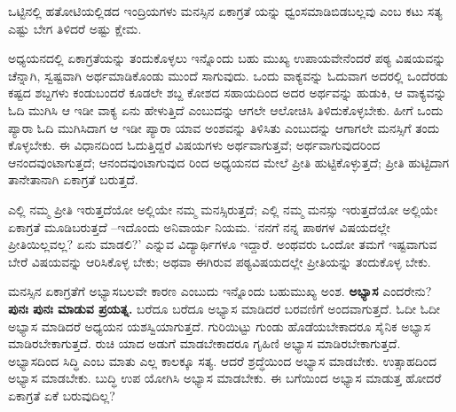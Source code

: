 ಒಟ್ಟಿನಲ್ಲಿ ಹತೋಟಿಯಲ್ಲಿಡದ ಇಂದ್ರಿಯಗಳು ಮನಸ್ಸಿನ ಏಕಾಗ್ರತೆ ಯನ್ನು ಧ್ವಂಸಮಾಡಿಬಿಡಬಲ್ಲವು ಎಂಬ ಕಟು ಸತ್ಯ ಎಷ್ಟು ಬೇಗ ತಿಳಿದರೆ ಅಷ್ಟು ಕ್ಷೇಮ.

ಅಧ್ಯಯನದಲ್ಲಿ ಏಕಾಗ್ರತೆಯನ್ನು ತಂದುಕೊಳ್ಳಲು ಇನ್ನೊಂದು ಬಹು ಮುಖ್ಯ ಉಪಾಯವೇನೆಂದರೆ ಪಠ್ಯ ವಿಷಯವನ್ನು ಚೆನ್ನಾಗಿ, ಸ್ವಷ್ಟವಾಗಿ ಅರ್ಥಮಾಡಿಕೊಂಡು ಮುಂದೆ ಸಾಗುವುದು. ಒಂದು ವಾಕ್ಯವನ್ನು ಓದುವಾಗ ಅದರಲ್ಲಿ ಒಂದೆರಡು ಕಷ್ಟದ ಶಬ್ದಗಳು ಕಂಡುಬಂದರೆ ಕೂಡಲೇ ಶಬ್ದ ಕೋಶದ ಸಹಾಯದಿಂದ ಅದರ ಅರ್ಥವನ್ನು ಹುಡುಕಿ, ಆ ವಾಕ್ಯವನ್ನು ಓದಿ ಮುಗಿಸಿ ಆ ಇಡೀ ವಾಕ್ಯ ಏನು ಹೇಳುತ್ತಿದೆ ಎಂಬುದನ್ನು ಆಗಲೇ ಆಲೋಚಿಸಿ ತಿಳಿದುಕೊಳ್ಳಬೇಕು. ಹೀಗೆ ಒಂದು ಪ್ಯಾರಾ ಓದಿ ಮುಗಿಸಿದಾಗ ಆ ಇಡೀ ಪ್ಯಾರಾ ಯಾವ ಅಂಶವನ್ನು ತಿಳಿಸಿತು ಎಂಬುದನ್ನು ಆಗಾಗಲೇ ಮನಸ್ಸಿಗೆ ತಂದು ಕೊಳ್ಳಬೇಕು. ಈ ವಿಧಾನದಿಂದ ಓದುತ್ತಿದ್ದರೆ ವಿಷಯಗಳು ಅರ್ಥವಾಗುತ್ತವೆ; ಅರ್ಥವಾಗುವುದರಿಂದ ಆನಂದವುಂಟಾಗುತ್ತದೆ; ಆನಂದವುಂಟಾಗುವುದ ರಿಂದ ಅಧ್ಯಯನದ ಮೇಲೆ ಪ್ರೀತಿ ಹುಟ್ಟಿಕೊಳ್ಳುತ್ತದೆ; ಪ್ರೀತಿ ಹುಟ್ಟಿದಾಗ ತಾನೇತಾನಾಗಿ ಏಕಾಗ್ರತೆ ಬರುತ್ತದೆ. 

ಎಲ್ಲಿ ನಮ್ಮ ಪ್ರೀತಿ ಇರುತ್ತದೆಯೋ ಅಲ್ಲಿಯೇ ನಮ್ಮ ಮನಸ್ಸಿರುತ್ತದೆ; ಎಲ್ಲಿ ನಮ್ಮ ಮನಸ್ಸು ಇರುತ್ತದೆಯೋ ಅಲ್ಲಿಯೇ ಏಕಾಗ್ರತೆ ಮೂಡಿಬರುತ್ತದೆ –ಇದೊಂದು ಅನಿವಾರ್ಯ ನಿಯಮ. ‘ನನಗೆ ನನ್ನ ಪಾಠಗಳ ವಿಷಯದಲ್ಲೇ ಪ್ರೀತಿಯಿಲ್ಲವಲ್ಲ? ಏನು ಮಾಡಲಿ?’ ಎನ್ನುವ ವಿದ್ಯಾರ್ಥಿಗಳೂ ಇದ್ದಾರೆ. ಅಂಥವರು ಒಂದೋ ತಮಗೆ ಇಷ್ಟವಾಗುವ ಬೇರೆ ವಿಷಯವನ್ನು ಆರಿಸಿಕೊಳ್ಳ ಬೇಕು; ಅಥವಾ ಈಗಿರುವ ಪಠ್ಯವಿಷಯದಲ್ಲೇ ಪ್ರೀತಿಯನ್ನು ತಂದುಕೊಳ್ಳ ಬೇಕು.

ಮನಸ್ಸಿನ ಏಕಾಗ್ರತೆಗೆ ಅಭ್ಯಾಸಬಲವೇ ಕಾರಣ ಎಂಬುದು ಇನ್ನೊಂದು ಬಹುಮುಖ್ಯ ಅಂಶ. \textbf{ಅಭ್ಯಾಸ} ಎಂದರೇನು? \textbf{ಪುನಃ ಪುನಃ ಮಾಡುವ ಪ್ರಯತ್ನ.} ಬರೆದೂ ಬರೆದೂ ಅಭ್ಯಾಸ ಮಾಡಿದರೆ ಬರವಣಿಗೆ ಅಂದವಾಗುತ್ತದೆ. ಓದೀ ಓದೀ ಅಭ್ಯಾಸ ಮಾಡಿದರೆ ಅಧ್ಯಯನ ಯಶಸ್ವಿಯಾಗುತ್ತದೆ. ಗುರಿಯಿಟ್ಟು ಗುಂಡು ಹೊಡೆಯಬೇಕಾದರೂ ಸೈನಿಕ ಅಭ್ಯಾಸ ಮಾಡಿರಬೇಕಾಗುತ್ತದೆ. ರುಚಿ ಯಾದ ಅಡುಗೆ ಮಾಡಬೇಕಾದರೂ ಗೃಹಿಣಿ ಅಭ್ಯಾಸ ಮಾಡಿರಬೇಕಾಗುತ್ತದೆ. ಅಭ್ಯಾಸದಿಂದ ಸಿದ್ಧಿ ಎಂಬ ಮಾತು ಎಲ್ಲ ಕಾಲಕ್ಕೂ ಸತ್ಯ. ಆದರೆ ಶ್ರದ್ಧೆಯಿಂದ ಅಭ್ಯಾಸ ಮಾಡಬೇಕು. ಉತ್ಸಾಹದಿಂದ ಅಭ್ಯಾಸ ಮಾಡಬೇಕು. ಬುದ್ಧಿ ಉಪ ಯೋಗಿಸಿ ಅಭ್ಯಾಸ ಮಾಡಬೇಕು. ಈ ಬಗೆಯಿಂದ ಅಭ್ಯಾಸ ಮಾಡುತ್ತ ಹೋದರೆ ಏಕಾಗ್ರತೆ ಏಕೆ ಬರುವುದಿಲ್ಲ?

